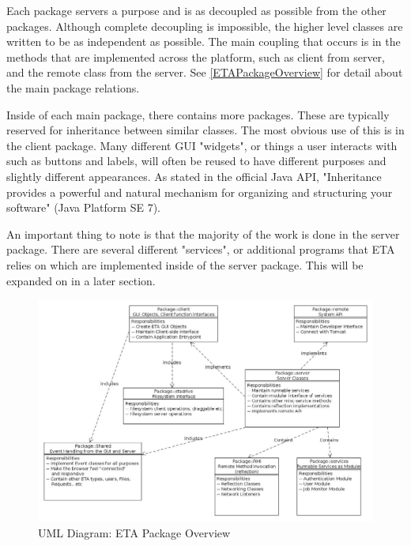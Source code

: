 \documentclass[a4paper,12pt]{texMemo}
\begin{document}
Each package servers a purpose and is as decoupled as possible from the other packages. Although complete decoupling is impossible, the higher level classes are written to be as independent as possible. The main coupling that occurs is in the methods that are implemented across the platform, such as client from server, and the remote class from the server. See  \ref{ETAPackageOverview} for detail about the main package relations. 

Inside of each main package, there contains more packages. These are typically reserved for inheritance between similar classes. The most obvious use of this is in the client package. Many different GUI "widgets", or things a user interacts with such as buttons and labels, will often be reused to have different purposes and slightly different appearances. As stated in the official Java API, "Inheritance provides a powerful and natural mechanism for organizing and structuring your software" (Java Platform SE 7).

An important thing to note is that the majority of the work is done in the server package. There are several different "services", or additional programs that ETA relies on which are implemented inside of the server package. This will be expanded on in a later section.
\\
\begin{figure}
\includegraphics[width=1\textwidth]{ETAPackageOverview.jpg}
\caption{UML Diagram: ETA Package Overview}
\label{fig:ETAPackageOverview}

\end{figure}






\setlength{\parindent}{0.5in}
 
\end{document}
